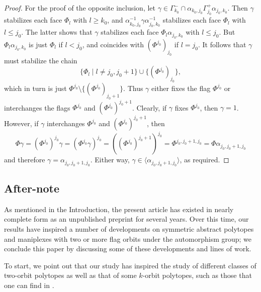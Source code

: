 \documentclass[12pt]{article}
\renewcommand{\>}{\rangle}
\renewcommand{\leq}{\leqslant}
\renewcommand{\geq}{\geqslant}
\theoremstyle{definition}\newtheorem{definition}{Definition}[section]
\begin{document}
\begin{proof}
For the proof of the opposite inclusion, let  
$\gamma\in\Gamma_{k_0}^{-}\cap\alpha_{k_0,j_0}\Gamma_{j_0}^{+}\alpha_{j_0,k_0}$. 
Then $\gamma$ stabilizes each face $\Phi_l$ with $l\geq k_0$, and $\alpha_{k_0,j_0}^{-1}\gamma\alpha_{j_0,k_0}^{-1}$ stabilizes each face $\Phi_l$ with $l\leq j_0$. The latter shows that $\gamma$ stabilizes each face $\Phi_l\alpha_{j_0,k_0}$ with $l\leq j_0$. But $\Phi_l\alpha_{j_0,k_0}$ is just $\Phi_l$ if $l<j_0$, and coincides with $(\Phi^{j_0})_{j_0}$ if $l=j_0$. It follows that $\gamma$ must stabilize the chain 
\[\{\Phi_l\mid l\neq j_0,j_{0}\!+\!1\}\cup\{(\Phi^{j_0})_{j_0}\},\]
which in turn is just $\Phi^{j_0}\setminus\{(\Phi^{j_0})_{j_{0}+1}\}$. Thus $\gamma$ either fixes the flag $\Phi^{j_0}$ or interchanges the flags $\Phi^{j_0}$ and $(\Phi^{j_0})^{j_{0}+1}$. Clearly, if $\gamma$ fixes $\Phi^{j_0}$, then $\gamma=1$. However, if $\gamma$ interchanges $\Phi^{j_0}$ and $(\Phi^{j_0})^{j_{0}+1}$,
then 
\[\Phi\gamma = (\Phi^{j_0})^{j_0}\gamma = (\Phi^{j_0}\gamma)^{j_0}
= ((\Phi^{j_0})^{j_{0}+1})^{j_0}=\Phi^{j_0,j_{0}+1,j_0} = \Phi\alpha_{j_0,j_{0}+1,j_0}\]
and therefore $\gamma=\alpha_{j_0,j_{0}+1,j_0}$. Either way, $\gamma\in\langle\alpha_{j_0,j_{0}+1,j_0}\rangle$, as required.
\end{proof}
\smallskip

\subsection*{After-note}
As mentioned in the Introduction, the present article has existed in nearly complete form as an unpublished preprint for several years.
Over this time, our results have inspired a number of developments on symmetric abstract polytopes and maniplexes with two or more flag orbits under the automorphism group; we conclude this paper by discussing some of these developments and lines of work.

To start, we point out that our study has inspired the study of different classes of two-orbit polytopes as well as that of some $k$-orbit polytopes, such as those that one can find in \cite{CP2018, HM2022, MiSW2014, MoS2012, MoS2021, MoS2022}.
\end{document}
